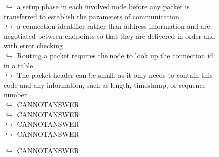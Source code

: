\documentclass[11pt,a4paper, onecolumn]{article}
\begin{document}
\begin{figure}[t] \small \begin{tcolorbox}[boxsep=0pt,left=5pt,right=0pt,top=2pt,colback = yellow!5] \begin{dialogue}
 \small 
\colorbox{pink!25}{$\hookrightarrow$}
{ a setup phase in each involved node before any packet is transferred to establish the parameters of communication }
\\
\colorbox{pink!25}{$\hookrightarrow$}
{ a connection identifier rather than address information and are negotiated between endpoints so that they are delivered in order and with error checking }
\\
\colorbox{pink!25}{$\hookrightarrow$}
{ Routing a packet requires the node to look up the connection id in a table }
\\
\colorbox{pink!25}{$\hookrightarrow$}
{ The packet header can be small, as it only needs to contain this code and any information, such as length, timestamp, or sequence number }
\\
\colorbox{pink!25}{$\hookrightarrow$}
{ CANNOTANSWER }
\\
\colorbox{pink!25}{$\hookrightarrow$}
{ CANNOTANSWER }
\\
\colorbox{pink!25}{$\hookrightarrow$}
{ CANNOTANSWER }
\\
\colorbox{pink!25}{$\hookrightarrow$}
{ CANNOTANSWER }
 \end{dialogue}\end{tcolorbox}\end{figure}\begin{figure}[t] \small \begin{tcolorbox}[boxsep=0pt,left=5pt,right=0pt,top=2pt,colback = yellow!5] \begin{dialogue}
 \small 
\colorbox{pink!25}{$\hookrightarrow$}
{ CANNOTANSWER }
\\

\end{dialogue}
\end{tcolorbox}
\end{figure}
\end{document}

